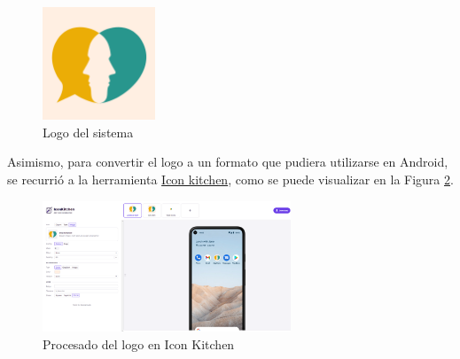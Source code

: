             \begin{figure}[h]
                \centering
                \includegraphics[width=0.3\textwidth]{figures/diseno/logo.png}
                \caption{Logo del sistema}
                \label{figure:disenio:logo}
            \end{figure}
            
            Asimismo, para convertir el logo a un formato que pudiera utilizarse en Android, se recurrió a la herramienta \href{https://icon.kitchen/}{Icon kitchen}, como se puede visualizar en la Figura \ref{figure:disenio:icon_litchen}.

            \begin{figure}[h]
                \centering
                \includegraphics[width=0.66\textwidth]{figures/diseno/Logo icon kitchen.png}
                \caption{Procesado del logo en Icon Kitchen}
                \label{figure:disenio:icon_litchen}
            \end{figure}